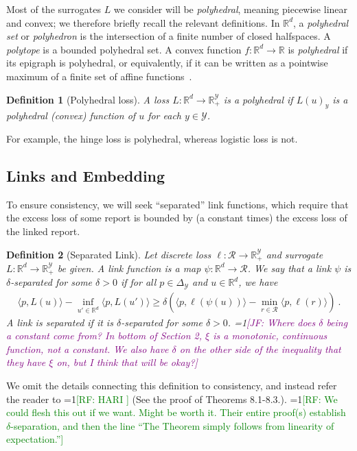 \documentclass[12pt]{article}
\newcommand{\Comments}{1}
\newcommand{\mynote}[2]{\ifnum\Comments=1\textcolor{#1}{#2}\fi}
\newcommand{\raf}[1]{\mynote{green}{[RF: #1]}}
\newcommand{\jessie}[1]{\mynote{purple}{[JF: #1]}}
\newcommand{\reals}{\mathbb{R}}
\newcommand{\simplex}{\Delta_\Y}
\newcommand{\R}{\mathcal{R}}
\newcommand{\Y}{\mathcal{Y}}
\newcommand{\inprod}[2]{\langle #1, #2 \rangle}%
\newtheorem{definition}{Definition}
\begin{document}
Most of the surrogates $L$ we consider will be \emph{polyhedral}, meaning piecewise linear and convex; we therefore briefly recall the relevant definitions.
In $\reals^d$, a \emph{polyhedral set} or \emph{polyhedron} is the intersection of a finite number of closed halfspaces.
A \emph{polytope} is a bounded polyhedral set.
A convex function $f:\reals^d\to\reals$ is \emph{polyhedral} if its epigraph is polyhedral, or equivalently, if it can be written as a pointwise maximum of a finite set of affine functions~\citep{rockafellar1997convex}.
%
\begin{definition}[Polyhedral loss]
  A loss $L: \reals^d \to \reals^{\Y}_+$ is a \emph{polyhedral} if $L(u)_y$ is a polyhedral (convex) function of $u$ for each $y\in\Y$.
\end{definition}
%
For example, the hinge loss is polyhedral, whereas logistic loss is not.

\subsection{Links and Embedding}

To ensure consistency, we will seek ``separated'' link functions, which require that the excess loss of some report is bounded by (a constant times) the excess loss of the linked report.

\begin{definition}[Separated Link]\label{def:links}
  Let discrete loss $\ell:\R\to\reals^\Y_+$ and surrogate $L:\reals^d\to\reals^\Y_+$ be given.
  A \emph{link function} is a map $\psi:\reals^d\to\R$.
  We say that a link $\psi$ is \emph{$\delta$-separated} for some $\delta > 0$ if for all $p \in \simplex$ and $u\in\reals^d$, we have
  \begin{align*}
    \inprod{p}{L(u)} - \inf_{u' \in \reals^d} \inprod{p}{L(u')} \geq \delta\left(\inprod{p}{\ell(\psi(u))} - \min_{r \in \R} \inprod{p}{\ell(r)}\right)~.
  \end{align*}
  A link is \emph{separated} if it is $\delta$-separated for some $\delta>0$.
  \jessie{Where does $\delta$ being a constant come from?  In \citet{ramaswamy2018consistent} bottom of Section 2, $\xi$ is a monotonic, continuous function, not a constant.  We also have $\delta$ on the other side of the inequality that they have $\xi$ on, but I think that will be okay?}
\end{definition}

We omit the details connecting this definition to consistency, and instead refer the reader to \raf{HARI \cite{ramaswamy2018consistent}} (See the proof of Theorems 8.1-8.3.).
\raf{We could flesh this out if we want.  Might be worth it.  Their entire proof(s) establish $\delta$-separation, and then the line ``The Theorem simply follows from linearity of expectation.''}
\end{document}
